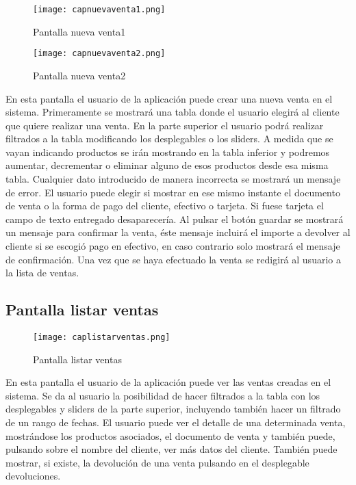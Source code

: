 \begin{figure}[!htb]
  \centering
    \texttt{[image: capnuevaventa1.png]}
  \caption{Pantalla nueva venta1}
  \label{a}
\end{figure}

\begin{figure}[!htb]
  \centering
    \texttt{[image: capnuevaventa2.png]}
  \caption{Pantalla nueva venta2}
  \label{a}
\end{figure}

En esta pantalla el usuario de la aplicación puede crear una nueva venta en el sistema. Primeramente se mostrará una tabla donde el usuario elegirá al cliente que quiere realizar una venta. En la parte superior el usuario podrá realizar filtrados a la tabla modificando los desplegables o los sliders. A medida que se vayan indicando productos se irán mostrando en la tabla inferior y podremos aumentar, decrementar o eliminar alguno de esos productos desde esa misma tabla. Cualquier dato introducido de manera incorrecta se mostrará un mensaje de error. El usuario puede elegir si mostrar en ese mismo instante el documento de venta o la forma de pago del cliente, efectivo o tarjeta. Si fuese tarjeta el campo de texto entregado desaparecería. Al pulsar el botón guardar se mostrará un mensaje para confirmar la venta, éste mensaje incluirá el importe a devolver al cliente si se escogió pago en efectivo, en caso contrario solo mostrará el mensaje de confirmación. Una vez que se haya efectuado la venta se redigirá al usuario a la lista de ventas.

\subsection {Pantalla listar ventas}

\begin{figure}[!htb]
  \centering
    \texttt{[image: caplistarventas.png]}
  \caption{Pantalla listar ventas}
  \label{a}
\end{figure}

En esta pantalla el usuario de la aplicación puede ver las ventas creadas en el sistema. Se da al usuario la posibilidad de hacer filtrados a la tabla con los desplegables y sliders de la parte superior, incluyendo también hacer un filtrado de un rango de fechas. El usuario puede ver el detalle de una determinada venta, mostrándose los productos asociados, el documento de venta y también puede, pulsando sobre el nombre del cliente, ver más datos del cliente. También puede mostrar, si existe, la devolución de una venta pulsando en el desplegable devoluciones.

